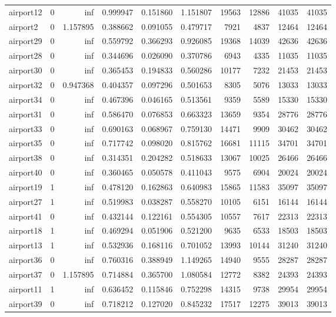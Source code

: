 \begin{longtable}{|l|r|r|r|r|r|r|r|r|r|}
airport12 & 0 & inf & 0.999947 & 0.151860 & 1.151807 & 19563 & 12886 & 41035 & 41035 \\
airport2 & 0 & 1.157895 & 0.388662 & 0.091055 & 0.479717 & 7921 & 4837 & 12464 & 12464 \\
airport29 & 0 & inf & 0.559792 & 0.366293 & 0.926085 & 19368 & 14039 & 42636 & 42636 \\
airport28 & 0 & inf & 0.344696 & 0.026090 & 0.370786 & 6943 & 4335 & 11035 & 11035 \\
airport30 & 0 & inf & 0.365453 & 0.194833 & 0.560286 & 10177 & 7232 & 21453 & 21453 \\
airport32 & 0 & 0.947368 & 0.404357 & 0.097296 & 0.501653 & 8305 & 5076 & 13033 & 13033 \\
airport34 & 0 & inf & 0.467396 & 0.046165 & 0.513561 & 9359 & 5589 & 15330 & 15330 \\
airport31 & 0 & inf & 0.586470 & 0.076853 & 0.663323 & 13659 & 9354 & 28776 & 28776 \\
airport33 & 0 & inf & 0.690163 & 0.068967 & 0.759130 & 14471 & 9909 & 30462 & 30462 \\
airport35 & 0 & inf & 0.717742 & 0.098020 & 0.815762 & 16681 & 11115 & 34701 & 34701 \\
airport38 & 0 & inf & 0.314351 & 0.204282 & 0.518633 & 13067 & 10025 & 26466 & 26466 \\
airport40 & 0 & inf & 0.360465 & 0.050578 & 0.411043 & 9575 & 6904 & 20024 & 20024 \\
airport19 & 1 & inf & 0.478120 & 0.162863 & 0.640983 & 15865 & 11583 & 35097 & 35097 \\
airport27 & 1 & inf & 0.519983 & 0.038287 & 0.558270 & 10105 & 6151 & 16144 & 16144 \\
airport41 & 0 & inf & 0.432144 & 0.122161 & 0.554305 & 10557 & 7617 & 22313 & 22313 \\
airport18 & 1 & inf & 0.469294 & 0.051906 & 0.521200 & 9635 & 6533 & 18503 & 18503 \\
airport13 & 1 & inf & 0.532936 & 0.168116 & 0.701052 & 13993 & 10144 & 31240 & 31240 \\
airport36 & 0 & inf & 0.760316 & 0.388949 & 1.149265 & 14940 & 9555 & 28287 & 28287 \\
airport37 & 0 & 1.157895 & 0.714884 & 0.365700 & 1.080584 & 12772 & 8382 & 24393 & 24393 \\
airport11 & 1 & inf & 0.636452 & 0.115846 & 0.752298 & 14315 & 9738 & 29954 & 29954 \\
airport39 & 0 & inf & 0.718212 & 0.127020 & 0.845232 & 17517 & 12275 & 39013 & 39013 \\

\end{longtable}

